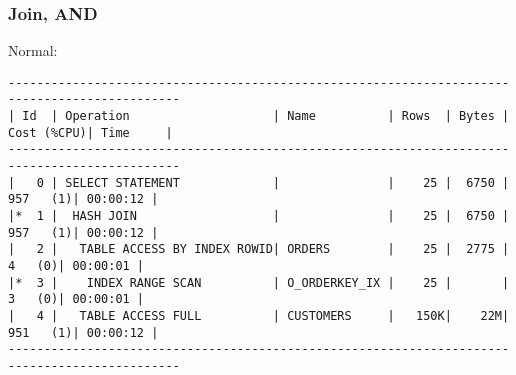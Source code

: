 \documentclass[11pt,a4paper,parskip=half]{scrartcl}
\begin{document}
\subsubsection{Join, AND}
Normal:
\begin{lstlisting}
----------------------------------------------------------------------------------------------                                                                                                                                                                                                               
| Id  | Operation                    | Name          | Rows  | Bytes | Cost (%CPU)| Time     |                                                                                                                                                                                                               
----------------------------------------------------------------------------------------------                                                                                                                                                                                                               
|   0 | SELECT STATEMENT             |               |    25 |  6750 |   957   (1)| 00:00:12 |                                                                                                                                                                                                               
|*  1 |  HASH JOIN                   |               |    25 |  6750 |   957   (1)| 00:00:12 |                                                                                                                                                                                                               
|   2 |   TABLE ACCESS BY INDEX ROWID| ORDERS        |    25 |  2775 |     4   (0)| 00:00:01 |                                                                                                                                                                                                               
|*  3 |    INDEX RANGE SCAN          | O_ORDERKEY_IX |    25 |       |     3   (0)| 00:00:01 |                                                                                                                                                                                                               
|   4 |   TABLE ACCESS FULL          | CUSTOMERS     |   150K|    22M|   951   (1)| 00:00:12 |                                                                                                                                                                                                               
----------------------------------------------------------------------------------------------                                                                                                                                                                                                               
                                                                                                                                                                                                                                                                                                             

\end{lstlisting}
\end{document}
